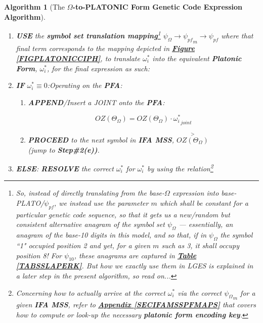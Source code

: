 \documentclass[a4paper, 18pt]{book} %
\newtheorem{alg}{Algorithm}
\begin{document}
\begin{alg}[The \textbf{$\Omega$-to-PLATONIC Form Genetic Code Expression Algorithm}]
\begin{enumerate}
{\begin{enumerate}
{\begin{enumerate}
    \item{\textbf{USE} the \textbf{symbol set translation mapping}\footnote{So, instead of directly translating from the base-$\Omega$ expression into base-PLATO/$\psi_{pf}$, we instead use the parameter $m$ which shall be constant for a particular genetic code sequence, so that it gets us a new/random but consistent alternative anagram of the symbol set $\psi_\Omega$ --- essentially, an anagram of the base-10 digits in this model, and so that, if in $\psi_\Omega$ the symbol ``1" occupied position 2 and yet, for a given $m$ such as 3, it shall occupy position 8! For $\psi_{10}$, these anagrams are captured in \textbf{\hyperref[TABSSLAPERK]{Table \ref{TABSSLAPERK}}}. But how we exactly use them in LGES is explained in a later step in the present algorithm, so read on...} $\psi_\Omega \rightarrow \boxed{\psi_{pf}}_m \rightarrow \psi_{pf}$ where that final term corresponds to the mapping depicted in \textbf{\hyperref[FIGPLATONICCIPH]{Figure \ref{FIGPLATONICCIPH}}}, to translate $\omega_i^*$ into the equivalent \textbf{Platonic Form}, $\boxed{\omega_i^*}$, for the final expression as such:}
\item { \textbf{IF} $\omega_i^* \equiv 0$:Operating on the \textbf{PFA}: 
		\begin{enumerate}
		\item { \textbf{APPEND}/Insert a JOINT onto the \textbf{PFA}:

		\vspace{1em}
		\begin{equation}
		\label{EQEXTFGEJOINTSUF}
		\boxed{OZ(\Theta_\Omega)} = \boxed{OZ(\Theta_\Omega)} \cdot \boxed{\omega_i^*}_{joint}
		\end{equation}
		\vspace{1em}				
		
		}
		\item \textbf{PROCEED} to the next symbol in \textbf{IFA MSS}, $\overset{>}{OZ(\Theta_\Omega)}$\\ (jump to \textbf{Step\#2(e))}.
		\end{enumerate}
	}
	\item { \textbf{ELSE}: \textbf{RESOLVE} the correct  $\boxed{\omega_i^*}$  for  $\omega_i^*$  by using the relation\footnote{Concerning how to actually arrive at the correct $\boxed{\omega_i^*}$ via the correct $\boxed{\psi_\Omega}_m$ for a given \textbf{IFA MSS}, refer to \textbf{\hyperref[SECIFAMSSPFMAPS]{Appendix \ref{SECIFAMSSPFMAPS}}} that covers how to compute or look-up the necessary \textbf{platonic form encoding key}.}\\


}
\end{enumerate}}
\end{enumerate}}
\end{enumerate}
\end{alg}
\end{document}
